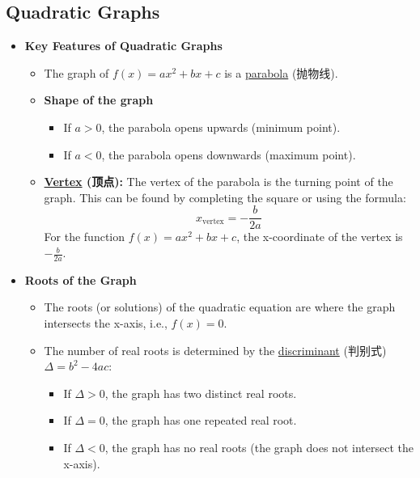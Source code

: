 
\subsection{Quadratic Graphs}
\begin{itemize}
    \item \textbf{Key Features of Quadratic Graphs}
    \begin{itemize}
        \item The graph of $f(x) = ax^2 + bx + c$ is a \underline{parabola} (抛物线).
        \item \textbf{Shape of the graph}
        \begin{itemize}
            \item If $a > 0$, the parabola opens upwards (minimum point).
            \item If $a < 0$, the parabola opens downwards (maximum point).
        \end{itemize}
        \item \textbf{\underline{Vertex} (顶点):} The vertex of the parabola is the turning point of the graph. This can be found
        by completing the square or using the formula:
        \begin{equation}
            x_{\text{vertex}} = -\frac{b}{2a}
        \end{equation}
        For the function $f(x) = ax^2 + bx + c$, the x-coordinate of the vertex is $-\frac{b}{2a}$.
    \end{itemize}
    \item \textbf{Roots of the Graph}
    \begin{itemize}
        \item The roots (or solutions) of the quadratic equation are where the graph intersects the x-axis, i.e., $f(x) = 0$.
        \item The number of real roots is determined by the \underline{discriminant} (判别式) $\Delta = b^2 - 4ac$:
        \begin{itemize}
            \item If $\Delta > 0$, the graph has two distinct real roots.
            \item If $\Delta = 0$, the graph has one repeated real root.
            \item If $\Delta < 0$, the graph has no real roots (the graph does not intersect the x-axis).
        \end{itemize}
    \end{itemize}
\end{itemize}